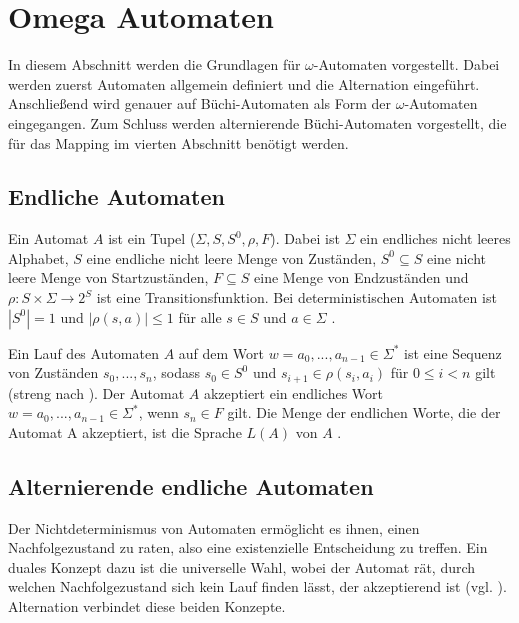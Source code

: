 \section{Omega Automaten}

In diesem Abschnitt werden die Grundlagen für $\omega$-Automaten vorgestellt. Dabei werden zuerst Automaten allgemein definiert und die Alternation eingeführt. Anschließend wird genauer auf Büchi-Automaten als Form der $\omega$-Automaten eingegangen. Zum Schluss werden alternierende Büchi-Automaten vorgestellt, die für das Mapping im vierten Abschnitt benötigt werden. 

\subsection{Endliche Automaten}
Ein Automat $A$ ist ein Tupel ($\Sigma, S, S^0, \rho, F$). Dabei ist $\Sigma$ ein endliches nicht leeres Alphabet, $S$ eine endliche nicht leere Menge von Zuständen, $S^0\subseteq S$ eine nicht leere Menge von Startzuständen, $F\subseteq S$ eine Menge von Endzuständen und $\rho : S \times \Sigma \rightarrow 2^S$ ist eine Transitionsfunktion. Bei deterministischen Automaten ist $|S^0|=1$ und $|\rho(s,a)|\leq 1$ für alle $s\in S$ und $a \in \Sigma$ \cite{vardi+96}.

Ein Lauf des Automaten $A$ auf dem Wort $w=a_0,...,a_{n-1}\in \Sigma^\ast$ ist eine Sequenz von Zuständen $s_0,...,s_n$, sodass $s_0 \in S^0$ und $s_{i+1} \in \rho(s_i, a_i)$ für $0\leq i<n$ gilt (streng nach \cite{vardi+96}). Der Automat $A$ akzeptiert ein endliches Wort $w=a_0,...,a_{n-1}\in\Sigma^\ast$, wenn $s_n\in F$ gilt. Die Menge der endlichen Worte, die der Automat A akzeptiert, ist die Sprache $L(A)$ von $A$ \cite{vardi+96}. 

\subsection{Alternierende endliche Automaten}
\label{AEA}
Der Nichtdeterminismus von Automaten ermöglicht es ihnen, einen Nachfolgezustand zu raten, also eine existenzielle Entscheidung zu treffen. Ein duales Konzept dazu ist die universelle Wahl, wobei der Automat rät, durch welchen Nachfolgezustand sich kein Lauf finden lässt, der akzeptierend ist (vgl. \cite{hofmann11}). Alternation verbindet diese beiden Konzepte. 


